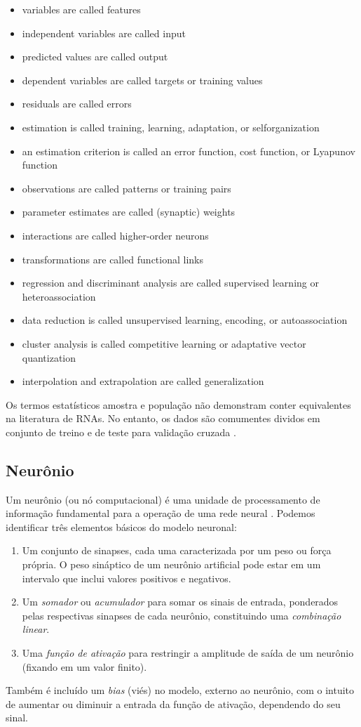 \documentclass{automatextcc}
\begin{document}
\begin{itemize}
    \item variables are called features
    \item independent variables are called input
    \item predicted values are called output
    \item dependent variables are called targets or training values
    \item residuals are called errors
    \item estimation is called training, learning, adaptation, or selforganization
    \item an estimation criterion is called an error function, cost function, or Lyapunov function
    \item observations are called patterns or training pairs
    \item parameter estimates are called (synaptic) weights
    \item interactions are called higher-order neurons
    \item transformations are called functional links
    \item regression and discriminant analysis are called supervised learning or heteroassociation
    \item data reduction is called unsupervised learning, encoding, or autoassociation
    \item cluster analysis is called competitive learning or adaptative vector quantization
    \item interpolation and extrapolation are called generalization
\end{itemize}
Os termos estatísticos amostra e população não demonstram conter equivalentes na literatura de RNAs. No entanto, os dados são comumentes dividos em conjunto de treino e de teste para validação cruzada \citep{cheng1994}.


\subsection{Neurônio}
Um neurônio (ou nó computacional) é uma unidade de processamento de informação fundamental para a operação de uma rede neural \citep{haykin2001}. Podemos identificar três elementos básicos do modelo neuronal:
\begin{enumerate}
    \item Um conjunto de sinapses, cada uma caracterizada por um peso ou força própria. O peso sináptico de um neurônio artificial pode estar em um intervalo que inclui valores positivos e negativos.
    \item Um \textit{somador} ou \textit{acumulador} para somar os sinais de entrada, ponderados pelas respectivas sinapses de cada neurônio, constituindo uma \textit{combinação linear}.
    \item Uma \textit{função de ativação} para restringir a amplitude de saída de um neurônio (fixando em um valor finito).
\end{enumerate}
Também é incluído um \textit{bias} (viés) no modelo, externo ao neurônio, com o intuito de aumentar ou diminuir a entrada da função de ativação, dependendo do seu sinal.
\end{document}
